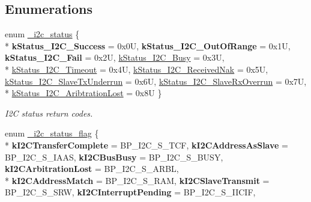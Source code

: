 \subsection*{Enumerations}
\begin{DoxyCompactItemize}
\item 
enum \hyperlink{group__i2c__hal_ga7cc91c89125c25a88e463a9e8550b284}{\+\_\+i2c\+\_\+status} \{ \\*
{\bfseries k\+Status\+\_\+\+I2\+C\+\_\+\+Success} = 0x0U, 
{\bfseries k\+Status\+\_\+\+I2\+C\+\_\+\+Out\+Of\+Range} = 0x1U, 
{\bfseries k\+Status\+\_\+\+I2\+C\+\_\+\+Fail} = 0x2U, 
\hyperlink{group__i2c__hal_gga7cc91c89125c25a88e463a9e8550b284a49091894b590d7e479605bf113918952}{k\+Status\+\_\+\+I2\+C\+\_\+\+Busy} = 0x3U, 
\\*
\hyperlink{group__i2c__hal_gga7cc91c89125c25a88e463a9e8550b284a81ad7cc198436cabbe91ea55c5288747}{k\+Status\+\_\+\+I2\+C\+\_\+\+Timeout} = 0x4U, 
\hyperlink{group__i2c__hal_gga7cc91c89125c25a88e463a9e8550b284a22495915fb9a79a80f89d93561e3769a}{k\+Status\+\_\+\+I2\+C\+\_\+\+Received\+Nak} = 0x5U, 
\hyperlink{group__i2c__hal_gga7cc91c89125c25a88e463a9e8550b284a59390c2b988d02e016ec014f9e014557}{k\+Status\+\_\+\+I2\+C\+\_\+\+Slave\+Tx\+Underrun} = 0x6U, 
\hyperlink{group__i2c__hal_gga7cc91c89125c25a88e463a9e8550b284ab286ded9de770504a53c67c4fa7ee64b}{k\+Status\+\_\+\+I2\+C\+\_\+\+Slave\+Rx\+Overrun} = 0x7U, 
\\*
\hyperlink{group__i2c__hal_gga7cc91c89125c25a88e463a9e8550b284a436dd56a766dbe6a7f2bddd7f29463d1}{k\+Status\+\_\+\+I2\+C\+\_\+\+Aribtration\+Lost} = 0x8U
 \}\begin{DoxyCompactList}\small\item\em I2C status return codes. \end{DoxyCompactList}
\item 
enum \hyperlink{group__i2c__hal_ga94540c1edc80ad8d2b3173114d04259d}{\+\_\+i2c\+\_\+status\+\_\+flag} \{ \\*
{\bfseries k\+I2\+C\+Transfer\+Complete} = B\+P\+\_\+\+I2\+C\+\_\+\+S\+\_\+\+T\+CF, 
{\bfseries k\+I2\+C\+Address\+As\+Slave} = B\+P\+\_\+\+I2\+C\+\_\+\+S\+\_\+\+I\+A\+AS, 
{\bfseries k\+I2\+C\+Bus\+Busy} = B\+P\+\_\+\+I2\+C\+\_\+\+S\+\_\+\+B\+U\+SY, 
{\bfseries k\+I2\+C\+Arbitration\+Lost} = B\+P\+\_\+\+I2\+C\+\_\+\+S\+\_\+\+A\+R\+BL, 
\\*
{\bfseries k\+I2\+C\+Address\+Match} = B\+P\+\_\+\+I2\+C\+\_\+\+S\+\_\+\+R\+AM, 
{\bfseries k\+I2\+C\+Slave\+Transmit} = B\+P\+\_\+\+I2\+C\+\_\+\+S\+\_\+\+S\+RW, 
{\bfseries k\+I2\+C\+Interrupt\+Pending} = B\+P\+\_\+\+I2\+C\+\_\+\+S\+\_\+\+I\+I\+C\+IF, 

\end{DoxyCompactItemize}
